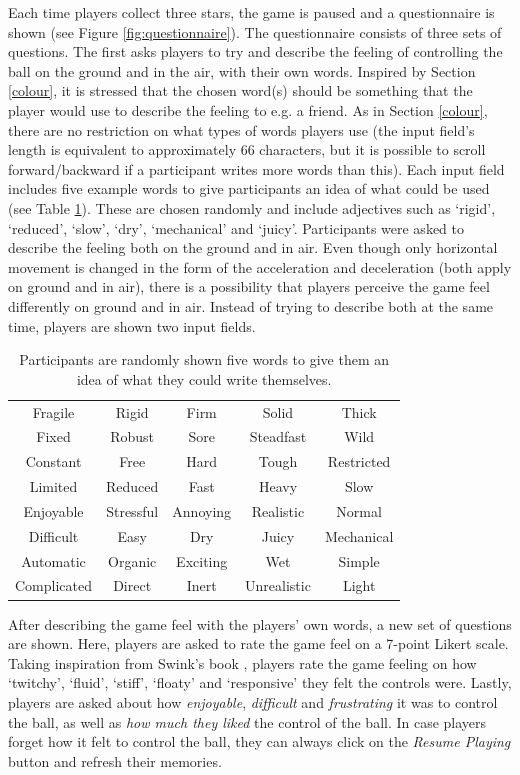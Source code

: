 Each time players collect three stars, the game is paused and a questionnaire is shown (see Figure \ref{fig:questionnaire}). The questionnaire consists of three sets of questions. The first asks players to try and describe the feeling of controlling the ball on the ground and in the air, with their own words. Inspired by Section \ref{colour}, it is stressed that the chosen word(s) should be something that the player would use to describe the feeling to e.g. a friend. As in Section \ref{colour}, there are no restriction on what types of words players use (the input field's length is equivalent to approximately 66 characters, but it is possible to scroll forward/backward if a participant writes more words than this). Each input field includes five example words to give participants an idea of what could be used (see Table \ref{table:wordsExamples}). These are chosen randomly and include adjectives such as `rigid', `reduced', `slow', `dry', `mechanical' and `juicy'. Participants were asked to describe the feeling both on the ground and in air. Even though only horizontal movement is changed in the form of the acceleration and deceleration (both apply on ground and in air), there is a possibility that players perceive the game feel differently on ground and in air. Instead of trying to describe both at the same time, players are shown two input fields.

\begin{table} \centering
\scriptsize
\caption{Participants are randomly shown five words to give them an idea of what they could write themselves.}
\label{table:wordsExamples}
\begin{tabular}{ccccc}
\midrule
Fragile & Rigid & Firm & Solid & Thick\\
Fixed & Robust & Sore & Steadfast & Wild\\
Constant & Free & Hard & Tough & Restricted\\
Limited & Reduced & Fast & Heavy & Slow\\
Enjoyable & Stressful & Annoying & Realistic & Normal\\
Difficult & Easy & Dry & Juicy & Mechanical\\
Automatic & Organic & Exciting & Wet & Simple\\
Complicated & Direct & Inert & Unrealistic & Light\\
\bottomrule
\end{tabular}
\end{table}

After describing the game feel with the players' own words, a new set of questions are shown. Here, players are asked to rate the game feel on a 7-point Likert scale. Taking inspiration from Swink's book \cite{swink}, players rate the game feeling on how `twitchy', `fluid', `stiff', `floaty' and `responsive' they felt the controls were. Lastly, players are asked about how \textit{enjoyable}, \textit{difficult} and \textit{frustrating} it was to control the ball, as well as \textit{how much they liked} the control of the ball. In case players forget how it felt to control the ball, they can always click on the \textit{Resume Playing} button and refresh their memories.

